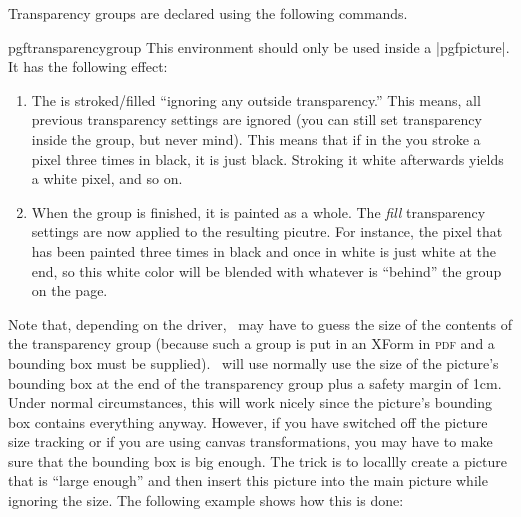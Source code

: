 Transparency groups are declared using the following commands.

\begin{environment}{{pgftransparencygroup}}
  This environment should only be used inside a |{pgfpicture}|. It has
  the following effect:
  \begin{enumerate}
  \item The  is stroked/filled
    ``ignoring any outside transparency.'' This means, all previous
    transparency settings are ignored (you can still set transparency
    inside the group, but never mind). This means that if in the
     you stroke a pixel three times in
    black, it is just black. Stroking it white afterwards yields a
    white pixel, and so on.
  \item When the group is finished, it is painted as a whole. The 
    \emph{fill} transparency settings are now applied to the resulting
    picutre. For instance, the pixel that has been painted three times
    in black and once in white is just white at the end, so this white
    color will be blended with whatever is ``behind'' the group on the
    page.
  \end{enumerate}

  Note that, depending on the driver, \pgfname\ may have to guess the
  size of the contents of the transparency group (because such a group
  is put in an XForm in \textsc{pdf} and a bounding box must be
  supplied). \pgfname\ will use normally use the size of the picture's
  bounding box at the end of the transparency group plus a safety
  margin of 1cm. Under normal circumstances, this will work nicely
  since the picture's bounding box contains everything
  anyway. However, if you have switched off the picture size tracking
  or if you are using canvas transformations, you may have to make
  sure that the bounding box is big enough. The trick is to locallly
  create a picture that is ``large enough'' and then insert this
  picture into the main picture while ignoring the size. The following
  example shows how this is done:

  
{\tikzexternaldisable
{}
}%



\end{environment}
